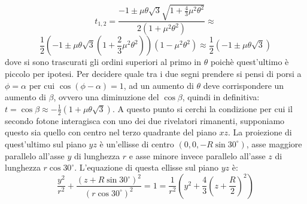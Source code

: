   $$ t_{1,2} = \frac{-1 \pm \mu \theta \sqrt{3} \sqrt{1 + \frac{4}{3} \mu^2 \theta^2 }}{2\left( 1 + \mu^2 \theta^2 \right)} \approx$$
  $$ \frac{1}{2}\left(-1 \pm \mu \theta \sqrt{3} \left(1 + \frac{2}{3} \mu^2 \theta^2 \right)\right)\left( 1 - \mu^2 \theta^2 \right) \approx \frac{1}{2} \left( -1 \pm \mu \theta \sqrt{3} \right)$$
  dove si sono trascurati gli ordini superiori al primo in \(\theta\) poichè quest'ultimo è piccolo per ipotesi. Per decidere quale tra i due segni prendere si pensi di porsi a
  \( \phi = \alpha \) per cui \(\cos \left( \phi - \alpha \right) = 1\), ad un aumento di \(\theta\) deve corrispondere un aumento di \(\beta\), ovvero una diminuzione del \(\cos \beta\),
  quindi in definitiva: \(t= \cos \beta \approx -\frac{1}{2} \left( 1 + \mu \theta \sqrt{3} \right) \).
  A questo punto si cerchi la condizione per cui il secondo fotone interagisca con uno dei due rivelatori rimanenti, supponiamo questo sia quello con centro nel terzo quadrante
  del piano \(xz\). La proiezione di quest'ultimo sul piano \(yz\) è un'ellisse di centro \(\left(0,0,-R \sin 30^\circ \right)\), asse maggiore parallelo all'asse \(y\) di lunghezza \(r\) e asse minore invece parallelo
  all'asse \(z\) di lunghezza \(r \cos 30^\circ\). L'equazione di questa ellisse sul piano \(yz\) è:
  $$ \frac{y^2}{r^2} + \frac{\left( z + R \sin 30^\circ \right)^2}{\left(r \cos 30^\circ\right)^2} = 1 = \frac{1}{r^2}\left(y^2 + \frac{4}{3} \left( z + \frac{R}{2} \right)^2 \right) $$
  
  
  
